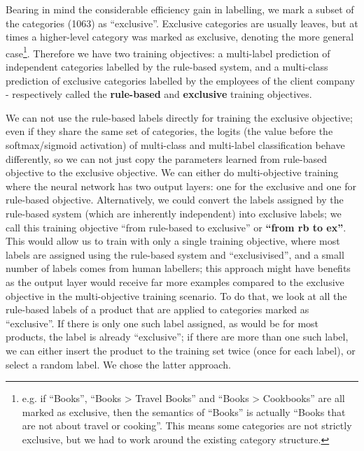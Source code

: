 Bearing in mind the considerable efficiency gain in labelling, we mark a subset of the categories (1063) as ``exclusive''.
Exclusive categories are usually leaves, but at times a higher-level category was marked as exclusive, denoting the more general case\footnote{e.g. if ``Books'', ``Books > Travel Books'' and ``Books > Cookbooks'' are all marked as exclusive, then the semantics of ``Books'' is actually ``Books that are not about travel or cooking''. This means some categories are not strictly exclusive, but we had to work around the existing category structure.}.
Therefore we have two training objectives: a multi-label prediction of independent categories labelled by the rule-based system, and a multi-class prediction of exclusive categories labelled by the employees of the client company - respectively called the \textbf{rule-based} and \textbf{exclusive} training objectives.

We can not use the rule-based labels directly for training the exclusive objective; even if they share the same set of categories, the logits (the value before the softmax/sigmoid activation) of multi-class and multi-label classification behave differently, so we can not just copy the parameters learned from rule-based objective to the exclusive objective.
We can either do multi-objective training where the neural network has two output layers: one for the exclusive and one for rule-based objective.
Alternatively, we could convert the labels assigned by the rule-based system (which are inherently independent) into exclusive labels; we call this training objective ``from rule-based to exclusive'' or \textbf{``from rb to ex''}.
This would allow us to train with only a single training objective, where most labels are assigned using the rule-based system and ``exclusivised'', and a small number of labels comes from human labellers; this approach might have benefits as the output layer would receive far more examples compared to the exclusive objective in the multi-objective training scenario.
To do that, we look at all the rule-based labels of a product that are applied to categories marked as ``exclusive''.
If there is only one such label assigned, as would be for most products, the label is already ``exclusive''; if there are more than one such label, we can either insert the product to the training set twice (once for each label), or select a random label.
We chose the latter approach.

\label{label_imbalance}

